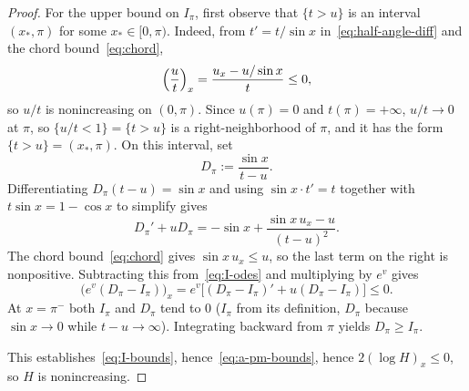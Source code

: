 \documentclass[10pt,a4paper]{amsart}
\begin{document}
\begin{proof}
For the upper bound on $I_\pi$, first observe that $\{t>u\}$ is an
interval $(x_*,\pi)$ for some $x_*\in[0,\pi)$. Indeed, from $t'=t/\sin x$
in~\eqref{eq:half-angle-diff} and the chord bound~\eqref{eq:chord},
\[
\Bigl(\frac u t\Bigr)_x=\frac{u_x-u/\sin x}{t}\leq 0,
\]
so $u/t$ is nonincreasing on $(0,\pi)$. Since $u(\pi)=0$ and
$t(\pi)=+\infty$, $u/t\to 0$ at $\pi$, so $\{u/t<1\}=\{t>u\}$ is a
right-neighborhood of $\pi$, and it has the form
$\{t>u\}=(x_*,\pi)$. On this interval, set
\[
D_\pi:=\frac{\sin x}{t-u}.
\]
Differentiating $D_\pi(t-u)=\sin x$ and using $\sin x\cdot t'=t$
together with $t\sin x=1-\cos x$ to simplify gives
\[
D_\pi'+uD_\pi=-\sin x+\frac{\sin x\,u_x-u}{(t-u)^2}.
\]
The chord bound~\eqref{eq:chord} gives $\sin x\,u_x\leq u$, so the
last term on the right is nonpositive. Subtracting this from~\eqref{eq:I-odes} and multiplying
by $e^v$ gives
\[
\bigl(e^v(D_\pi-I_\pi)\bigr)_x=e^v\bigl[(D_\pi-I_\pi)'+u(D_\pi-I_\pi)\bigr]\leq 0.
\]
At $x=\pi^-$ both $I_\pi$ and $D_\pi$ tend to $0$ ($I_\pi$ from its
definition, $D_\pi$ because $\sin x\to 0$ while $t-u\to\infty$).
Integrating backward from $\pi$ yields $D_\pi\geq I_\pi$.

This establishes~\eqref{eq:I-bounds}, hence~\eqref{eq:a-pm-bounds},
hence $2(\log H)_x\leq 0$, so $H$ is nonincreasing.
\end{proof}
\end{document}
